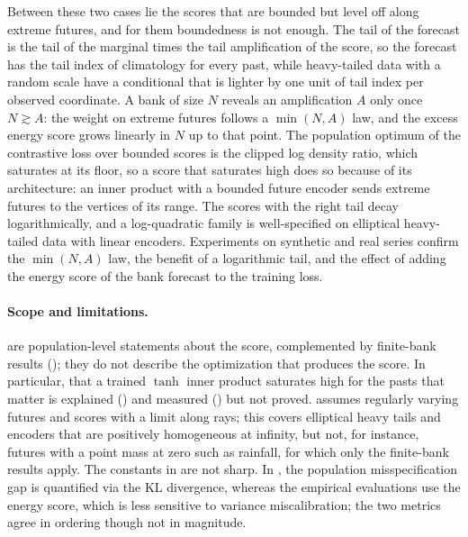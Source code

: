 \documentclass[11pt]{article}
\theoremstyle{plain}
\theoremstyle{definition}
\theoremstyle{remark}
\begin{document}
Between these two cases lie the scores that are bounded but level off along
extreme futures, and for them boundedness is not enough. The tail of the
forecast is the tail of the marginal times the tail amplification of the
score, so the forecast has the tail index of climatology for every past,
while heavy-tailed data with a random scale have a conditional that is
lighter by one unit of tail index per observed coordinate. A bank of size
$N$ reveals an amplification $A$ only once $N\gtrsim A$: the weight on
extreme futures follows a $\min(N,A)$ law, and the excess energy score grows
linearly in $N$ up to that point. The population optimum of the contrastive
loss over bounded scores is the clipped log density ratio, which saturates
at its floor, so a score that saturates high does so because of its
architecture: an inner product with a bounded future encoder sends extreme
futures to the vertices of its range. The scores with the right tail decay
logarithmically, and a log-quadratic family is well-specified on elliptical
heavy-tailed data with linear encoders. Experiments on synthetic and real
series confirm the $\min(N,A)$ law, the benefit of a logarithmic tail, and
the effect of adding the energy score of the bank forecast to the training
loss.

\paragraph{Scope and limitations.}
 are population-level statements about the
score, complemented by finite-bank results
(); they do not
describe the optimization that produces the score. In particular, that a
trained $\tanh$ inner product saturates high for the pasts that matter is
explained () and measured () but
not proved.  assumes regularly varying futures and scores with
a limit along rays; this covers elliptical heavy tails and encoders that are
positively homogeneous at infinity, but not, for instance, futures with a
point mass at zero such as rainfall, for which only the finite-bank results
apply. The constants in  are not sharp. In
, the population misspecification gap is quantified via
the KL divergence, whereas the empirical evaluations use the energy score,
which is less sensitive to variance miscalibration; the two metrics agree in
ordering though not in magnitude.
\end{document}
